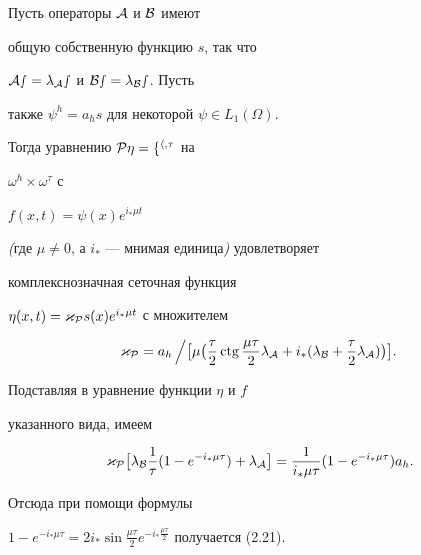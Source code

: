 \begin{lem} Пусть операторы $\cal A$ и $\cal B$ имеют


общую собственную функцию $s$, так что 


$\cal A s=\lambda_{\cal A}s$ и $\cal B s=\lambda_{\cal B}s$. Пусть 


также $\psi^h=a_hs$ для некоторой $\psi\in L_1(\Omega)$.


Тогда уравнению $\cal P\eta=f^{h,\tau}$ на 


$\omega^h\times\omega^\tau$ с 


$f(x,t)=\psi(x)e^{i_\ast\mu t}$


{\em (}где $\mu\ne 0$, а $i_\ast$ --- мнимая единица{\em )} удовлетворяет 


комплекснозначная сеточная функция


$\eta(x,t)=\varkappa_{\cal P}s(x)e^{i_\ast\mu t}$ с множителем


\begin{equation}


\varkappa_{\cal P}=a_h \left/


\bigl[\mu\bigl(\frac{\tau}{2}\ctg\frac{\mu\tau}{2}


\lambda_{\cal A}+i_\ast(\lambda_{\cal B}


+\frac{\tau}{2}\lambda_{\cal A})\bigr)\bigr].\right.


\end{equation}


\end{lem}





\begin{pf} Подставляя в уравнение функции $\eta$ и $f$ 


указанного вида, имеем 


$$


\varkappa_{\cal P}\bigl[\lambda_{\cal B}\frac{1}{\tau}(1-e^{-i_\ast\mu \tau}


)+\lambda_{\cal A}\bigr]=\frac{1}{i_\ast\mu\tau}(1-e^{-i_\ast\mu \tau}


)a_h.


$$


Отсюда при помощи формулы 


$1-e^{-i_\ast \mu\tau}=2i_\ast\sin\frac{\mu\tau}{2}e^{-i_\ast


\frac{\mu\tau}{2}}$ получается (2.21).


\end{pf}





